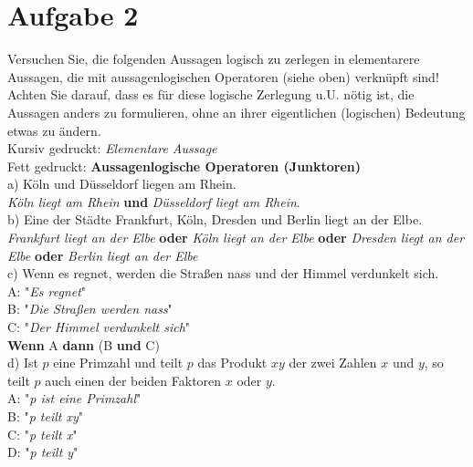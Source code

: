\section*{Aufgabe 2}

Versuchen Sie, die folgenden Aussagen logisch zu zerlegen in elementarere Aussagen, die mit aussagenlogischen Operatoren (siehe oben) verknüpft sind!\\

Achten Sie darauf, dass es für diese logische Zerlegung u.U. nötig ist, die Aussagen anders zu formulieren, ohne an ihrer eigentlichen (logischen) Bedeutung etwas zu ändern.\\

Kursiv gedruckt: \textit{Elementare Aussage}\\
Fett gedruckt: \textbf{Aussagenlogische Operatoren (Junktoren)}\\

a) Köln und Düsseldorf liegen am Rhein.\\

\textit{Köln liegt am Rhein} \textbf{und} \textit{Düsseldorf liegt am Rhein}.\\

b) Eine der Städte Frankfurt, Köln, Dresden und Berlin liegt an der Elbe.\\

\textit{Frankfurt liegt an der Elbe} \textbf{oder} \textit{Köln liegt an der Elbe} \textbf{oder} \textit{Dresden liegt an der Elbe} \textbf{oder} \textit{Berlin liegt an der Elbe}\\

c) Wenn es regnet, werden die Straßen nass und der Himmel verdunkelt sich.\\

A: "\textit{Es regnet}"\\
B: "\textit{Die Straßen werden nass}"\\
C: "\textit{Der Himmel verdunkelt sich}"\\

\textbf{Wenn} A \textbf{dann} (B \textbf{und} C)\\

d) Ist $p$ eine Primzahl und teilt $p$ das Produkt $xy$ der zwei Zahlen $x$ und $y$, so teilt $p$ auch einen der beiden Faktoren $x$ oder $y$.\\

A: "\textit{p ist eine Primzahl}"\\
B: "\textit{p teilt xy}"\\
C: "\textit{p teilt x}"\\
D: "\textit{p teilt y}"\\

